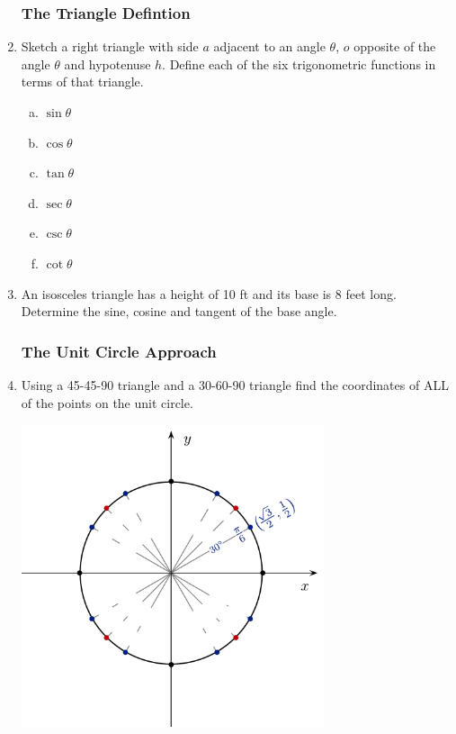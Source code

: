 \documentclass[11pt,fleqn]{article}
\begin{document}
\begin{enumerate}
\subsubsection*{The Triangle Defintion}

\item Sketch a right triangle with side $a$ adjacent to an
angle $\theta$, $o$ opposite of the angle $\theta$ and hypotenuse
$h$. Define each of the six trigonometric functions in terms of that
triangle. 


  \begin{multicols}{6}{
      \vspace*{-0.45in}
      \begin{enumerate}[a)]
      \item $\sin \theta$
      \item $\cos \theta$
      \item $\tan \theta$
      \item $\sec \theta$
      \item $\csc \theta$
      \item $\cot \theta$
      \end{enumerate}}
  \end{multicols}

\vskip1in

\item An isosceles triangle has a height of 10 ft and its base is 8 feet long. Determine the sine, cosine and tangent of the base angle.
\vfill

\subsubsection*{The Unit Circle Approach}

\item Using a 45-45-90 triangle and a 30-60-90 triangle
find the coordinates of ALL of the points on the unit circle.
\begin{flushleft}
  \includegraphics[width=3.5in]{blank-unit-circle}
\end{flushleft}


\end{enumerate}
\end{document}
